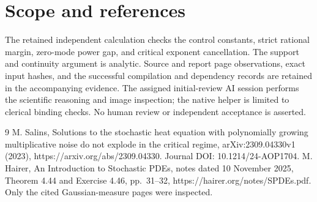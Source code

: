 \documentclass[10pt]{article}
\begin{document}
\section*{Scope and references}
The retained independent calculation checks the control constants, strict rational margin, zero-mode power gap, and critical exponent cancellation. The support and continuity argument is analytic. Source and report page observations, exact input hashes, and the successful compilation and dependency records are retained in the accompanying evidence. The assigned initial-review AI session performs the scientific reasoning and image inspection; the native helper is limited to clerical binding checks. No human review or independent acceptance is asserted.\par
9 M. Salins, Solutions to the stochastic heat equation with polynomially growing multiplicative noise do not explode in the critical regime, arXiv:2309.04330v1 (2023), https://arxiv.org/abs/2309.04330. Journal DOI: 10.1214/24-AOP1704. M. Hairer, An Introduction to Stochastic PDEs, notes dated 10 November 2025, Theorem 4.44 and Exercise 4.46, pp. 31–32, https://hairer.org/notes/SPDEs.pdf. Only the cited Gaussian-measure pages were inspected.\par
\end{document}
